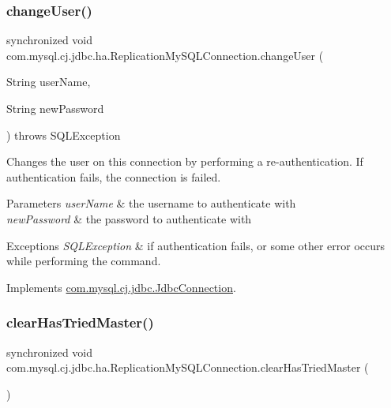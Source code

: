 \subsubsection{\texorpdfstring{change\+User()}{changeUser()}}
{\footnotesize\ttfamily synchronized void com.\+mysql.\+cj.\+jdbc.\+ha.\+Replication\+My\+S\+Q\+L\+Connection.\+change\+User (\begin{DoxyParamCaption}\item[{String}]{user\+Name,  }\item[{String}]{new\+Password }\end{DoxyParamCaption}) throws S\+Q\+L\+Exception}

Changes the user on this connection by performing a re-\/authentication. If authentication fails, the connection is failed.


\begin{DoxyParams}{Parameters}
{\em user\+Name} & the username to authenticate with \\
\hline
{\em new\+Password} & the password to authenticate with \\
\hline
\end{DoxyParams}

\begin{DoxyExceptions}{Exceptions}
{\em S\+Q\+L\+Exception} & if authentication fails, or some other error occurs while performing the command. \\
\hline
\end{DoxyExceptions}


Implements \mbox{\hyperlink{interfacecom_1_1mysql_1_1cj_1_1jdbc_1_1_jdbc_connection_aed0496e0f2c1236f2784f92b45a482ef}{com.\+mysql.\+cj.\+jdbc.\+Jdbc\+Connection}}.

\mbox{\label{classcom_1_1mysql_1_1cj_1_1jdbc_1_1ha_1_1_replication_my_s_q_l_connection_aa198df19289a6a2ba3ae72ec55c10f62}} 
\subsubsection{\texorpdfstring{clear\+Has\+Tried\+Master()}{clearHasTriedMaster()}}
{\footnotesize\ttfamily synchronized void com.\+mysql.\+cj.\+jdbc.\+ha.\+Replication\+My\+S\+Q\+L\+Connection.\+clear\+Has\+Tried\+Master (\begin{DoxyParamCaption}{ }\end{DoxyParamCaption})}



